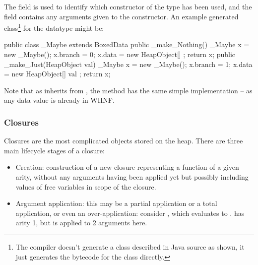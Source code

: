 \documentclass[dissertation.tex]{subfiles}
\begin{document}
{{{            The  field is used to identify which constructor of the type has been used, and the
             field contains any arguments given to the constructor. An example generated
            class\footnote{The compiler doesn't generate a class described in Java source as shown, it just
            generates the bytecode for the class directly.} for the datatype  might be:

            \begin{javafigure}
            public class _Maybe extends BoxedData {
                public _make_Nothing() {
                    _Maybe x = new _Maybe();
                    x.branch = 0;
                    x.data = new HeapObject[] {};
                    return x;
                }
                public _make_Just(HeapObject val) {
                    _Maybe x = new _Maybe();
                    x.branch = 1;
                    x.data = new HeapObject[] { val };
                    return x;
                }
            }
            \end{javafigure}

            Note that as  inherits from , the  method has the same simple
            implementation -- as any data value is already in WHNF.

        }
        \subsubsection{Closures}\label{sec:closures}
        {

            Closures are the most complicated objects stored on the heap. There are three main lifecycle stages of a
            closure:

            \begin{itemize}
            \item
            {
                Creation: construction of a new closure representing a function of a given arity, without any
                arguments having been applied yet but possibly including values of free variables in scope of the
                closure.
            }
            \item
            {
                
                Argument application: this may be a partial application or a total application, or even an
                over-application: consider , which evaluates to .  has
                arity 1, but is applied to 2 arguments here.

}
\end{itemize}}}}
\end{document}
